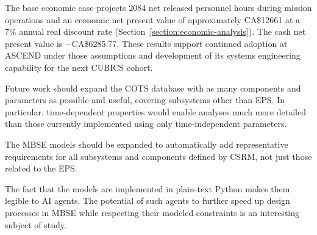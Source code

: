 The base economic case projects 2084 net released personnel hours during mission operations and an economic net present value of approximately CA\$12661 at a 7\% annual real discount rate (Section~\ref{section:economic-analysis}).
The cash net present value is $-$CA\$6285.77.
These results support continued adoption at ASCEND under those assumptions and development of its systems engineering capability for the next CUBICS cohort.

Future work should expand the COTS database with as many components and parameters as possible and useful, covering subsystems other than EPS.
In particular, time-dependent properties would enable analyses much more detailed than those currently implemented using only time-independent parameters.

The MBSE models should be expanded to automatically add representative requirements for all subsystems and components defined by CSRM, not just those related to the EPS.

The fact that the models are implemented in plain-text Python makes them legible to AI agents.
The potential of such agents to further speed up design processes in MBSE while respecting their modeled constraints is an interesting subject of study.
